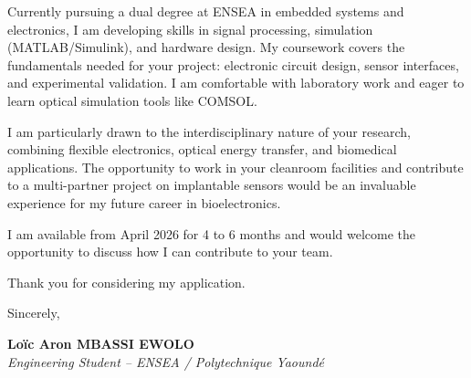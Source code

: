 \documentclass[a4paper,11pt]{article}
\begin{document}
Currently pursuing a dual degree at ENSEA in embedded systems and electronics, I am developing skills in signal processing, simulation (MATLAB/Simulink), and hardware design. My coursework covers the fundamentals needed for your project: electronic circuit design, sensor interfaces, and experimental validation. I am comfortable with laboratory work and eager to learn optical simulation tools like COMSOL.

I am particularly drawn to the interdisciplinary nature of your research, combining flexible electronics, optical energy transfer, and biomedical applications. The opportunity to work in your cleanroom facilities and contribute to a multi-partner project on implantable sensors would be an invaluable experience for my future career in bioelectronics.

I am available from April 2026 for 4 to 6 months and would welcome the opportunity to discuss how I can contribute to your team.

Thank you for considering my application.

\vspace{0.8cm}

Sincerely,

\vspace{0.5cm}

\textbf{Loïc Aron MBASSI EWOLO}\\
\textit{Engineering Student -- ENSEA / Polytechnique Yaoundé}
\end{document}
